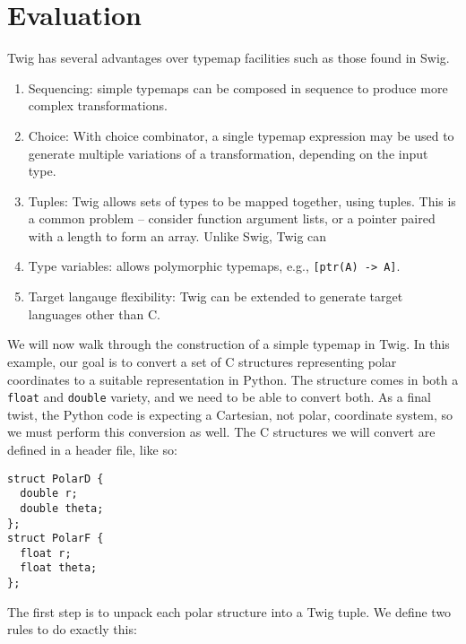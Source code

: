 
\section{Evaluation}

Twig has several advantages over typemap facilities such as those found in Swig.

\begin{enumerate}

\item Sequencing: simple typemaps can be composed in sequence to produce more complex transformations.

\item Choice: With choice combinator, a single typemap expression may be used to generate multiple variations of a transformation, depending on the input type.

\item Tuples: Twig allows sets of types to be mapped together, using tuples. This is a common problem -- consider function argument lists, or a pointer paired with a length to form an array. Unlike Swig, Twig can 

\item Type variables: allows polymorphic typemaps, e.g., \texttt{[ptr(A) -> A]}.
  
\item Target langauge flexibility: Twig can be extended to generate target languages other than C.

\end{enumerate}

We will now walk through the construction of a simple typemap in Twig. In this example, our goal is to convert a set of C structures representing polar coordinates to a suitable representation in Python. The structure comes in both a \texttt{float} and \texttt{double} variety, and we need to be able to convert both. As a final twist, the Python code is expecting a Cartesian, not polar, coordinate system, so we must perform this conversion as well. The C structures we will convert are defined in a header file, like so:

\begin{verbatim}
struct PolarD {
  double r;
  double theta;
};
struct PolarF {
  float r;
  float theta;
};
\end{verbatim}

The first step is to unpack each polar structure into a Twig tuple. We define two rules to do exactly this:

